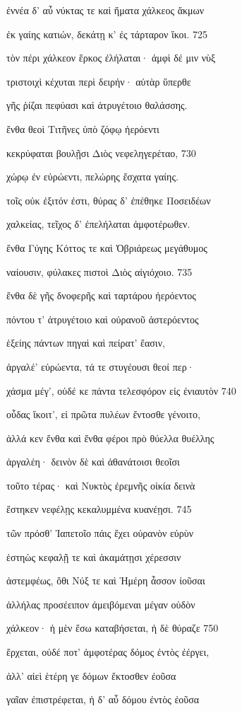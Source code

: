 ἐννέα δ' αὖ νύκτας τε καὶ ἤματα χάλκεος ἄκμων

ἐκ γαίης κατιών, δεκάτῃ κ' ἐς τάρταρον ἵκοι. \num{725} 

τὸν πέρι χάλκεον ἕρκος ἐλήλαται· ἀμφὶ δέ μιν νὺξ 

τριστοιχὶ κέχυται περὶ δειρήν· αὐτὰρ ὕπερθε

γῆς ῥίζαι πεφύασι καὶ ἀτρυγέτοιο θαλάσσης.

ἔνθα θεοὶ Τιτῆνες ὑπὸ ζόφῳ ἠερόεντι

κεκρύφαται βουλῇσι Διὸς νεφεληγερέταο, \num{730} 

χώρῳ ἐν εὐρώεντι, πελώρης ἔσχατα γαίης.

τοῖς οὐκ ἐξιτόν ἐστι, θύρας δ' ἐπέθηκε Ποσειδέων 

χαλκείας, τεῖχος δ' ἐπελήλαται ἀμφοτέρωθεν.

ἔνθα Γύγης Κόττος τε καὶ Ὀβριάρεως μεγάθυμος 

ναίουσιν, φύλακες πιστοὶ Διὸς αἰγιόχοιο. \num{735}

ἔνθα δὲ γῆς δνοφερῆς καὶ ταρτάρου ἠερόεντος 

πόντου τ' ἀτρυγέτοιο καὶ οὐρανοῦ ἀστερόεντος

ἑξείης πάντων πηγαὶ καὶ πείρατ' ἔασιν,

ἀργαλέ' εὐρώεντα, τά τε στυγέουσι θεοί περ·

χάσμα μέγ', οὐδέ κε πάντα τελεσφόρον εἰς ἐνιαυτὸν \num{740}

οὖδας ἵκοιτ', εἰ πρῶτα πυλέων ἔντοσθε γένοιτο,

ἀλλά κεν ἔνθα καὶ ἔνθα φέροι πρὸ θύελλα θυέλλης 

ἀργαλέη· δεινὸν δὲ καὶ ἀθανάτοισι θεοῖσι 

τοῦτο τέρας· καὶ Νυκτὸς ἐρεμνῆς οἰκία δεινὰ

ἕστηκεν νεφέλῃς κεκαλυμμένα κυανέῃσι. \num{745} 

τῶν πρόσθ' Ἰαπετοῖο πάις ἔχει οὐρανὸν εὐρὺν

ἑστηὼς κεφαλῇ τε καὶ ἀκαμάτῃσι χέρεσσιν

ἀστεμφέως, ὅθι Νύξ τε καὶ Ἡμέρη ἆσσον ἰοῦσαι

ἀλλήλας προσέειπον ἀμειβόμεναι μέγαν οὐδὸν 

χάλκεον· ἡ μὲν ἔσω καταβήσεται, ἡ δὲ θύραζε \num{750} 

ἔρχεται, οὐδέ ποτ' ἀμφοτέρας δόμος ἐντὸς ἐέργει,

ἀλλ' αἰεὶ ἑτέρη γε δόμων ἔκτοσθεν ἐοῦσα

γαῖαν ἐπιστρέφεται, ἡ δ' αὖ δόμου ἐντὸς ἐοῦσα 

